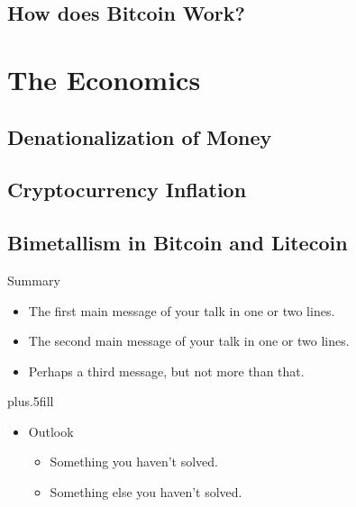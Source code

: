\documentclass[]{beamer}
\begin{document}
\subsection{How does Bitcoin Work?}

\section{The Economics}

\subsection{Denationalization of Money}

\subsection{Cryptocurrency Inflation}

\subsection{Bimetallism in Bitcoin and Litecoin}


\begin{frame}{Summary}

  \begin{itemize}
  \item
    The \alert{first main message} of your talk in one or two lines.
  \item
    The \alert{second main message} of your talk in one or two lines.
  \item
    Perhaps a \alert{third message}, but not more than that.
  \end{itemize}
  
  \vskip0pt plus.5fill
  \begin{itemize}
  \item
    Outlook
    \begin{itemize}
    \item
      Something you haven't solved.
    \item
      Something else you haven't solved.
    \end{itemize}
  \end{itemize}
\end{frame}
\end{document}
